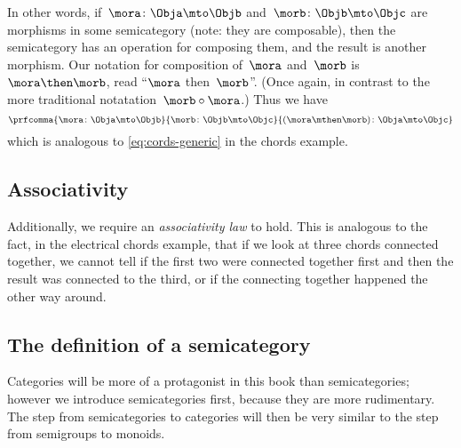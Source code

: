 In other words, if~$\mora\colon \Obja \mto \Objb$ and~$\morb\colon \Objb \mto \Objc$ are morphisms in some semicategory (note: they are composable), then the semicategory has an operation for composing them, and the result is another morphism.
Our notation for composition of~$\mora$ and~$\morb$ is~$\mora \then \morb$, read ``$\mora$ then~$\morb$''.
(Once again, in contrast to the more traditional notatation~$\morb \circ \mora$.) Thus we have
\begin{equation*}
    \prfcomma{
        \mora \colon \Obja \mto \Objb
    }{
        \morb\colon \Objb \mto \Objc
    }{
        (\mora \mthen \morb )\colon \Obja \mto \Objc
    }
\end{equation*}
which is analogous to \cref{eq:cords-generic}  in the chords example.

\subsection{Associativity}


Additionally, we require an \emph{associativity law} to hold.
This is analogous to the fact, in the electrical chords example, that if we look at three chords connected together, we cannot tell if the first two were connected together first and then the result was connected to the third, or if the connecting together happened the other way around.

\subsection{The definition of a semicategory}

Categories will be more of a protagonist in this book than semicategories; however we introduce semicategories first, because they are more rudimentary.
The step from semicategories to categories will then be very similar to the step from semigroups to monoids.

